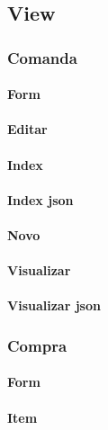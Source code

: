 \subsection{View}
\setcounter{secnumdepth}{4}
\subsubsection{Comanda}
\paragraph{Form}

\paragraph{Editar}

\paragraph{Index}

\paragraph{Index json}

\paragraph{Novo}

\paragraph{Visualizar}

\paragraph{Visualizar json}



\subsubsection{Compra}
\paragraph{Form}

\paragraph{Item}

